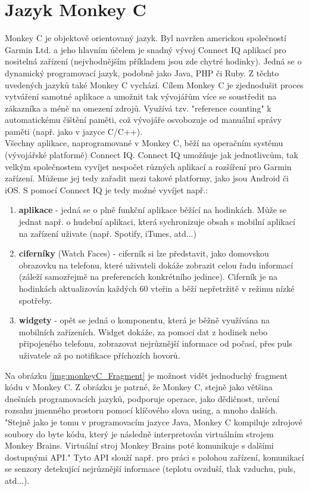 \chapter{Jazyk Monkey C}
Monkey C \cite{monkeyc_2021} je objektově orientovaný jazyk. Byl navržen americkou společností Garmin Ltd. \cite{GARMIN_OFFICIAL} a jeho hlavním účelem je snadný vývoj Connect IQ aplikací pro nositelná zařízení (nejvhodnějším příkladem jsou zde chytré hodinky). Jedná se o dynamický programovací jazyk, podobně jako Java, PHP či Ruby. Z těchto uvedených jazyků také Monkey C vychází. Cílem Monkey C je zjednodušit proces vytváření samotné aplikace a umožnit tak vývojářům více se soustředit na zákazníka a méně na omezení zdrojů. Využívá tzv. "reference counting" k automatickému čištění paměti, což vývojáře osvobozuje od manuální správy paměti (např. jako v jazyce C/C++).
\\
Všechny aplikace, naprogramované v Monkey C, běží na operačním systému (vývojářské platformě) Connect IQ. \cite{Garmin_Connect_IQ} Connect IQ umožňuje jak jednotlivcům, tak velkým společnostem vyvíjet nespočet různých aplikací a rozšíření pro Garmin zařízení. Můžeme jej tedy zařadit mezi takové platformy, jako jsou Android či iOS. S pomocí Connect IQ je tedy možné vyvíjet např.:

\begin{enumerate}
\item \textbf{aplikace} - jedná se o plně funkční aplikace běžící na hodinkách. Může se jednat např. o hudební aplikaci, která sychronizuje obsah s mobilní aplikací na zařízení uživate (např. Spotify, iTunes, atd...)
\item \textbf{ciferníky} (Watch Faces) - ciferník si lze představit, jako domovskou obrazovku na telefonu, které uživateli dokáže zobrazit celou řadu informací (záleží samozřejmě na preferencích konkrétního jedince). Ciferník je na hodinkách aktualizován každých 60 vteřin a běží nepřetržitě v režimu nízké spotřeby.
\item \textbf{widgety} - opět se jedná o komponentu, která je běžně využívána na mobilních zařízeních. Widget dokáže, za pomocí dat z hodinek nebo připojeného telefonu, zobrazovat nejrůznější informace od počasí, přes puls uživatele až po notifikace příchozích hovorů. 
\end{enumerate}

Na obrázku \ref{img:monkeyC_Fragment} je možnost vidět jednoduchý fragment kódu v Monkey C. Z obrázku je patrné, že Monkey C, stejně jako většina dnešních programovacích jazyků, podporuje operace, jako dědičnost, určení rozsahu jmenného prostoru pomocí klíčového slova using, a mnoho dalších. "Stejně jako je tomu v programovacím jazyce Java, Monkey C kompiluje zdrojové soubory do byte kódu, který je následně interpretován virtuálním strojem Monkey Brains. Virtuální stroj Monkey Brains poté komunikuje s dalšími dostupnými API." \cite{věnsek_2019} Tyto API slouží např. pro práci s polohou zařízení, komunikací se senzory detekující nejrůznější informace (teplotu ovzduší, tlak vzduchu, puls, atd...).


